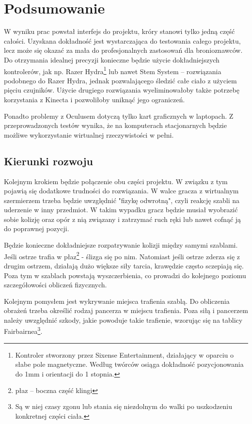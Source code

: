 \chapter{Podsumowanie} \label{cha:podsumowanie}

W wyniku prac powstał interfejs do projektu, króry stanowi tylko jedną część całości.
Uzyskana dokładność jest wystarczająca do testowania całego projektu,
lecz może się okazać za mała do profesjonalnych zastosowań dla bronioznawców.
Do otrzymania idealnej precyzji konieczne będzie użycie dokładniejszych kontrolerów, jak np. Razer Hydra\footnote{
	Kontroler stworzony przez Sixense Entertainment, działający w oparciu o słabe pole magnetyczne. Według twórców osiąga dokładność pozycjonowania do 1mm i orientacji do 1 stopnia.
}
lub nawet Stem System -- rozwiązania podobnego do Razer Hydra, 
jednak pozwalającego śledzić całe ciało z użyciem pięciu czujników.
Użycie drugiego rozwiązania wyeliminowałoby także potrzebę korzystania z Kinecta i pozwoliłoby uniknąć jego ograniczeń.

Ponadto problemy z Oculusem dotyczą tylko kart graficznych w laptopach.
Z przeprowadzonych testów wynika, 
że na komputerach stacjonarnych będzie możliwe wykorzystanie wirtualnej rzeczywistości w pełni.

\section{Kierunki rozwoju} \label{sec:rozwoj}
Kolejnym krokiem będzie połączenie obu części projektu. 
W związku z tym pojawią się dodatkowe trudności do rozwiązania.
W walce gracza z wirtualnym szermierzem trzeba będzie uwzględnić "fizykę odwrotną", 
czyli reakcję szabli na uderzenie w inny przedmiot. 
W takim wypadku gracz będzie musiał wyobrazić sobie kolizję oraz opór z nią związany i zatrzymać ruch ręki 
lub nawet cofnąć ją do poprawnej pozycji.

Będzie konieczne dokładniejsze rozpatrywanie kolizji między samymi szablami.
Jeśli ostrze trafia w płaz\footnote{ płaz -- boczna część klingi} - ślizga się po nim. 
Natomiast jeśli ostrze zderza się z drugim ostrzem, 
działają dużo większe siły tarcia, 
krawędzie często sczepiają się. 
Poza tym w szablach powstają wyszczerbienia, 
co prowadzi do kolejnego poziomu szczegółowości obliczeń fizycznych.

Kolejnym pomysłem jest wykrywanie miejsca trafienia szablą. 
Do obliczenia obrażeń trzeba określić rodzaj pancerza w miejscu trafienia. 
Poza siłą i pancerzem należy uwzględnić szkody, jakie powoduje takie trafienie, 
wzorując się na tablicy Fairbairn\textquotesingle ea\footnote{
	Są w niej czasy zgonu lub stania się niezdolnym do walki po uszkodzeniu konkretnej części ciała.
}.

